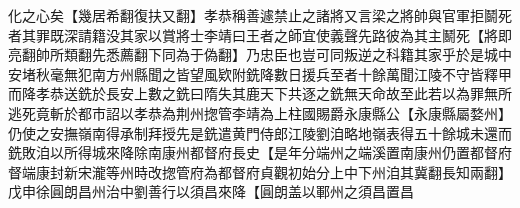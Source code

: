 化之心矣【幾居希翻復扶又翻】孝恭稱善遽禁止之諸將又言梁之將帥與官軍拒鬬死者其罪既深請籍没其家以賞將士李靖曰王者之師宜使義聲先路彼為其主鬭死【將即亮翻帥所類翻先悉薦翻下同為于偽翻】乃忠臣也豈可同叛逆之科籍其家乎於是城中安堵秋毫無犯南方州縣聞之皆望風欵附銑降數日援兵至者十餘萬聞江陵不守皆釋甲而降孝恭送銑於長安上數之銑曰隋失其鹿天下共逐之銑無天命故至此若以為罪無所逃死竟斬於都市詔以孝恭為荆州揔管李靖為上柱國賜爵永康縣公【永康縣屬婺州】仍使之安撫嶺南得承制拜授先是銑遣黄門侍郎江陵劉洎略地嶺表得五十餘城未還而銑敗洎以所得城來降除南康州都督府長史【是年分端州之端溪置南康州仍置都督府督端康封新宋瀧等州時改揔管府為都督府貞觀初始分上中下州洎其冀翻長知兩翻】　戊申徐圓朗昌州治中劉善行以須昌來降【圓朗盖以鄆州之須昌置昌